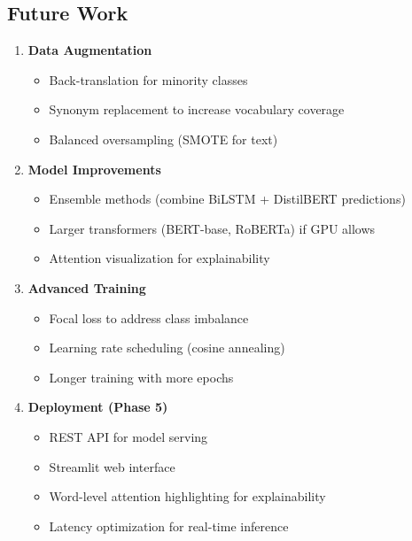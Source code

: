 \documentclass[12pt,a4paper]{article}
\begin{document}
\subsection{Future Work}
\begin{enumerate}
    \item \textbf{Data Augmentation}
    \begin{itemize}
        \item Back-translation for minority classes
        \item Synonym replacement to increase vocabulary coverage
        \item Balanced oversampling (SMOTE for text)
    \end{itemize}
    
    \item \textbf{Model Improvements}
    \begin{itemize}
        \item Ensemble methods (combine BiLSTM + DistilBERT predictions)
        \item Larger transformers (BERT-base, RoBERTa) if GPU allows
        \item Attention visualization for explainability
    \end{itemize}
    
    \item \textbf{Advanced Training}
    \begin{itemize}
        \item Focal loss to address class imbalance
        \item Learning rate scheduling (cosine annealing)
        \item Longer training with more epochs
    \end{itemize}
    
    \item \textbf{Deployment (Phase 5)}
    \begin{itemize}
        \item REST API for model serving
        \item Streamlit web interface
        \item Word-level attention highlighting for explainability
        \item Latency optimization for real-time inference
    \end{itemize}
\end{enumerate}
\end{document}
